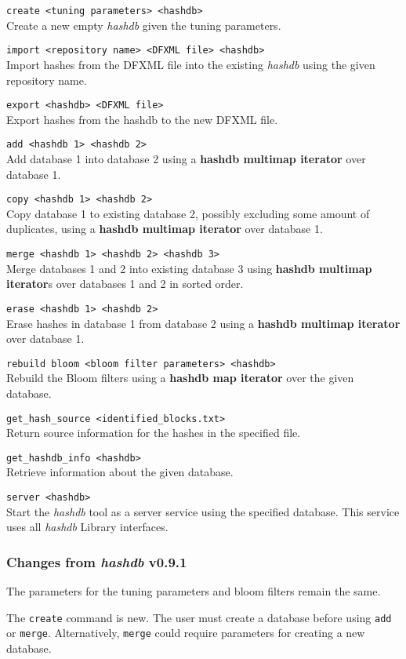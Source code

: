 \documentclass[12pt,twoside]{article}
\newcommand{\hdb}{\emph{hashdb}\xspace}
\newcommand{\hmi}{\textbf{hashdb map iterator}\xspace}
\newcommand{\hmmi}{\textbf{hashdb multimap iterator}\xspace}
\begin{document}
\begin{compactitem}
\item \texttt{create <tuning parameters> <hashdb>} \\
Create a new empty \hdb given the tuning parameters.
\item \texttt{import <repository name> <DFXML file> <hashdb>} \\
Import hashes from the DFXML file into the existing \hdb
using the given repository name.
\item \texttt{export <hashdb> <DFXML file>} \\
Export hashes from the hashdb to the new DFXML file.
\item \texttt{add <hashdb 1> <hashdb 2>} \\
Add database 1 into database 2
using a \hmmi over database 1.
\item \texttt{copy <hashdb 1> <hashdb 2>} \\
Copy database 1 to existing database 2,
possibly excluding some amount of duplicates,
using a \hmmi over database 1.
\item \texttt{merge <hashdb 1> <hashdb 2> <hashdb 3>} \\
Merge databases 1 and 2 into existing database 3
using {\hmmi}s over databases 1 and 2 in sorted order.
\item \texttt{erase <hashdb 1> <hashdb 2>} \\
Erase hashes in database 1 from database 2
using a \hmmi over database 1.
\item \texttt{rebuild bloom <bloom filter parameters> <hashdb>} \\
Rebuild the Bloom filters
using a \hmi over the given database.
\item \texttt{get\_hash\_source <identified\_blocks.txt>} \\
Return source information for the hashes in the specified file.
\item \texttt{get\_hashdb\_info <hashdb>} \\
Retrieve information about the given database.
\item \texttt{server <hashdb>} \\
Start the \hdb tool as a server service using the specified database.
This service uses all \hdb Library interfaces.
\end{compactitem}

\subsubsection{Changes from \hdb v0.9.1}
\begin{compactitem}
\item The parameters for the tuning parameters and bloom filters
remain the same.
\item The \texttt{create} command is new.
The user must create a database before using \texttt{add} or \texttt{merge}.
Alternatively, \texttt{merge} could require parameters for creating
a new database.
\end{compactitem}
\end{document}
